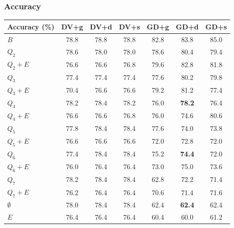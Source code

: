 \documentclass{beamer}
\begin{document}
\begin{frame}
  \frametitle{Accuracy}
  \footnotesize
  \begin{table}[h]
    \centering
    \begin{tabular}{l|c|c|c|c|c|c}
      \hline
      \multicolumn{1}{c}{\bfseries Accuracy (\%)} & \multicolumn{1}{c}{\bfseries DV+g} &
      \multicolumn{1}{c}{\bfseries DV+d} & \multicolumn{1}{c}{\bfseries DV+s} &
      \multicolumn{1}{c}{\bfseries GD+g} & \multicolumn{1}{c}{\bfseries GD+d} &
      \multicolumn{1}{c}{\bfseries GD+s}\\
      \hline
      $B$         & 78.8 & 78.8 & 78.8 & 82.8 & 83.8 & 85.0\\
      $Q_2$       & 78.6 & 78.0 & 78.0 & 78.6 & 80.4 & 79.4\\
      $Q_2+E$     & 76.6 & 76.6 & 76.8 & 79.6 & 82.8 & 81.8\\
      $Q_3$       & 77.4 & 77.4 & 77.4 & 77.6 & 80.2 & 79.8\\
      $Q_3+E$     & 70.4 & 76.6 & 76.6 & 79.2 & 81.2 & 77.4\\
      $Q_4$       & 78.2 & 78.4 & 78.2 & 76.0 & \textbf{78.2} & 76.4\\
      $Q_4+E$     & 76.6 & 76.6 & 76.8 & 76.0 & 74.6 & 80.6\\
      $Q_5$       & 77.8 & 78.4 & 78.4 & 77.6 & 74.0 & 73.8\\
      $Q_5+E$     & 76.6 & 76.6 & 76.6 & 72.0 & 72.8 & 72.0\\
      $Q_6$       & 77.4 & 78.4 & 78.4 & 75.2 & \textbf{74.4} & 72.0\\
      $Q_6+E$     & 76.0 & 76.4 & 76.4 & 73.0 & 75.0 & 73.6\\
      $Q_7$       & 78.2 & 78.4 & 78.4 & 62.8 & 72.2 & 71.4\\
      $Q_7+E$     & 76.2 & 76.4 & 76.4 & 70.6 & 71.4 & 71.6\\
      $\emptyset$ & 78.0 & 78.4 & 78.4 & 62.4 & \textbf{62.4} & 62.4\\
      $E$         & 76.4 & 76.4 & 76.4 & 60.4 & 60.0 & 61.2\\
    \end{tabular}
  \end{table}
\end{frame}
\end{document}
